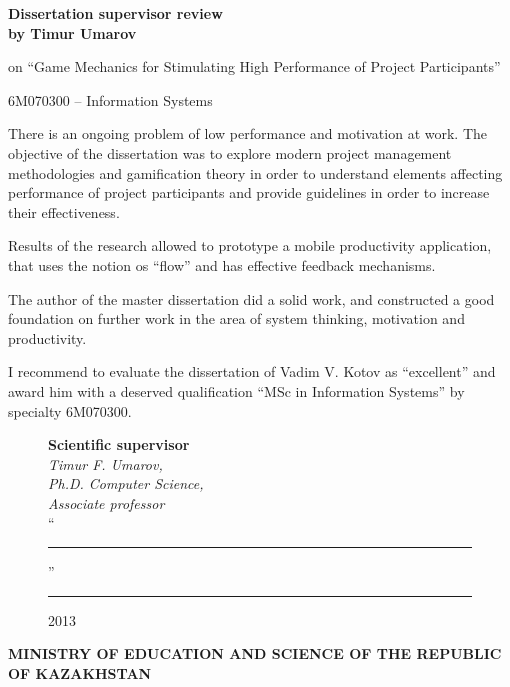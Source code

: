 \begin{titlepage}
\begin{centering}
        {\bf
        Dissertation supervisor review\\
        by Timur Umarov
        }
        
        on ``Game Mechanics for Stimulating High Performance of Project Participants''

        \vspace{14pt}
        \small 6M070300 -- Information Systems

    \end{centering}
    
    
    There is an ongoing problem of low performance and motivation at work. The objective of the dissertation was to explore modern project management methodologies and gamification theory in order to understand elements affecting performance of project participants and provide guidelines in order to increase their effectiveness.
    
    Results of the research allowed to prototype a mobile productivity application, that uses the notion os ``flow'' and has effective feedback mechanisms.
    
    The author of the master dissertation did a solid work, and constructed a good foundation on further work in the area of system thinking, motivation and productivity.
    
    I recommend to evaluate the dissertation of Vadim V. Kotov as ``excellent'' and award him with a deserved qualification ``MSc in Information Systems'' by specialty 6M070300.
    

         \begin{figure}[ht]
            \begin{minipage}[t]{0.6\linewidth}
                {\bf Scientific supervisor}\\

                {\em Timur F. Umarov,\\
                Ph.D. Computer Science,\\
                Associate professor}\\
                
                ``\rule{2em}{0.4pt}'' \rule{8em}{0.4pt} 2013\\
         \end{minipage}
    \end{figure}
        
        \pagebreak
        

    \begin{centering}
        {\bf{\MakeUppercase{Ministry of education and science of the republic of Kazakhstan}}

}
\end{centering}
\end{titlepage}
